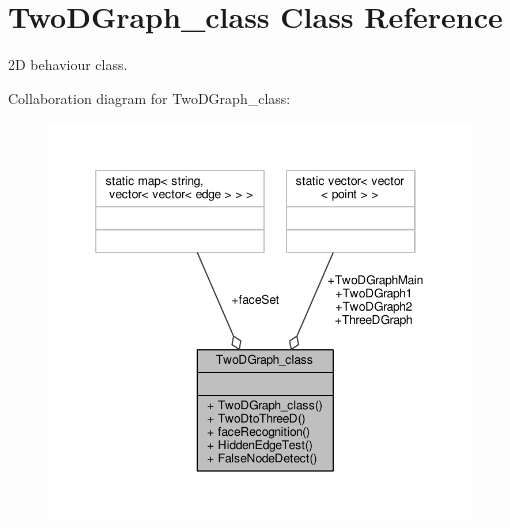 \hypertarget{classTwoDGraph__class}{}\section{Two\+D\+Graph\+\_\+class Class Reference}
\label{classTwoDGraph__class}


2D behaviour class.  




Collaboration diagram for Two\+D\+Graph\+\_\+class\+:
\nopagebreak
\begin{figure}[H]
\begin{center}
\leavevmode
\includegraphics[width=350pt]{classTwoDGraph__class__coll__graph}
\end{center}
\end{figure}
